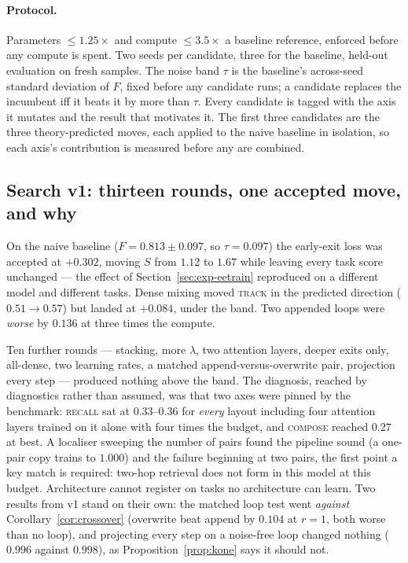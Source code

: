 \paragraph{Protocol.} Parameters $\le 1.25\times$ and compute $\le 3.5\times$
a baseline reference, enforced before any compute is spent. Two seeds per
candidate, three for the baseline, held-out evaluation on fresh samples. The
noise band $\tau$ is the baseline's across-seed standard deviation of $F$,
fixed before any candidate runs; a candidate replaces the incumbent iff it
beats it by more than $\tau$. Every candidate is tagged with the axis it
mutates and the result that motivates it. The first three candidates are the
three theory-predicted moves, each applied to the naive baseline in
isolation, so each axis's contribution is measured before any are combined.

\subsection{Search v1: thirteen rounds, one accepted move, and why}

On the naive baseline ($F = 0.813 \pm 0.097$, so $\tau = 0.097$) the
early-exit loss was accepted at $+0.302$, moving $S$ from $1.12$ to $1.67$
while leaving every task score unchanged --- the effect of
Section~\ref{sec:exp-eetrain} reproduced on a different model and different
tasks. Dense mixing moved \textsc{track} in the predicted direction
($0.51 \to 0.57$) but landed at $+0.084$, under the band. Two appended loops
were \emph{worse} by $0.136$ at three times the compute.

Ten further rounds --- stacking, more $\lambda$, two attention layers, deeper
exits only, all-dense, two learning rates, a matched append-versus-overwrite
pair, projection every step --- produced nothing above the band. The
diagnosis, reached by diagnostics rather than assumed, was that two axes were
pinned by the benchmark: \textsc{recall} sat at $0.33$--$0.36$ for
\emph{every} layout including four attention layers trained on it alone with
four times the budget, and \textsc{compose} reached $0.27$ at best. A
localiser sweeping the number of pairs found the pipeline sound (a one-pair
copy trains to $1.000$) and the failure beginning at two pairs, the first
point a key match is required: two-hop retrieval does not form in this model
at this budget. Architecture cannot register on tasks no architecture can
learn. Two results from v1 stand on their own: the matched loop test went
\emph{against} Corollary~\ref{cor:crossover} (overwrite beat append by
$0.104$ at $r=1$, both worse than no loop), and projecting every step on a
noise-free loop changed nothing ($0.996$ against $0.998$), as
Proposition~\ref{prop:kone} says it should not.

